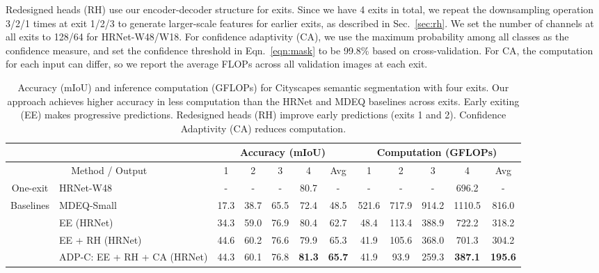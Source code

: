 \documentclass{article} %
\renewcommand{\cite}{\citep}
\begin{document}
Redesigned heads (RH) use our encoder-decoder structure for exits.
Since we have 4 exits in total, we repeat the downsampling operation 3/2/1 times at exit 1/2/3 to generate larger-scale features for earlier exits, as described in Sec.~\ref{sec:rh}.
We set the number of channels at all exits to 128/64 for HRNet-W48/W18.
For confidence adaptivity (CA), we use the maximum probability among all classes as the confidence measure, and set the confidence threshold in Eqn.~\ref{eqn:mask} to be 99.8\% based on cross-validation.
For CA, the computation for each input can differ, so we report the average FLOPs across all validation images at each exit. 

\setlength{\tabcolsep}{2pt}
\renewcommand{\arraystretch}{1.2}
\begin{table}[t]
\vspace{-2ex}
\centering
\footnotesize
\begin{tabular}{c|l|ccccc|ccccc}
\hline
\multicolumn{2}{c|}{}                            & \multicolumn{5}{c}{Accuracy (mIoU)}         & \multicolumn{5}{|c}{Computation (GFLOPs)}            \\ \hline
\multicolumn{2}{c|}{Method / Output}             & 1    & 2    & 3    & 4    & Avg  & 1     & 2     & 3     & 4      & Avg   \\ \hline
 One-exit & HRNet-W48 \cite{wang2020deep}           & -    & -    & -    & 80.7 & -    & -     & -     & -     & 696.2  & -     \\ \hline
\multirow{3}{*}{Baselines} & MDEQ-Small  \cite{bai2020multiscale}      & 17.3 & 38.7 & 65.5 & 72.4 & 48.5 & 521.6 & 717.9 & 914.2 & 1110.5 & 816.0 \\ 
                           & EE (HRNet)      & 34.3 & 59.0 & 76.9 & 80.4 & 62.7 & 48.4  & 113.4 & 388.9 & 722.2  & 318.2 \\
                           \hline
\multirow{2}{*}{Ours}      
                           & EE + RH (HRNet)    & 44.6 & 60.2 & 76.6 & 79.9 & 65.3 & 41.9  & 105.6 & 368.0 & 701.3  & 304.2 \\
                           & ADP-C: EE + RH + CA (HRNet) & 44.3 & 60.1 & 76.8 & \textbf{81.3} & \textbf{65.7} & 41.9  & 93.9  & 259.3 & \textbf{387.1}  & \textbf{195.6} \\ \hline
\end{tabular}
\vspace{0ex}
\caption{%
Accuracy (mIoU) and inference computation (GFLOPs) for Cityscapes semantic segmentation with four exits.
Our approach achieves higher accuracy in less computation than the HRNet and MDEQ baselines across exits.
Early exiting (EE) makes progressive predictions.
Redesigned heads (RH) improve early predictions (exits 1 and 2).
Confidence Adaptivity (CA) reduces computation.
}
\vspace{-1ex}
\label{tab:semseg}
\end{table}
\end{document}
